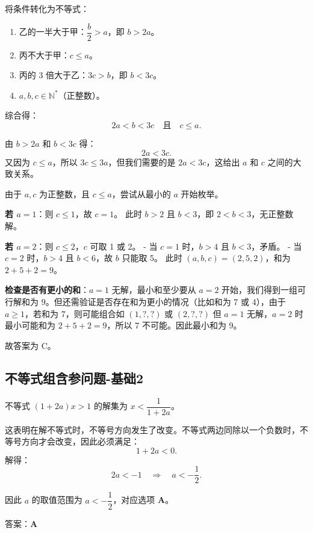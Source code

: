 将条件转化为不等式：

\begin{enumerate}
    \item 乙的一半大于甲：\(\dfrac{b}{2} > a\)，即 \(b > 2a\)。
    \item 丙不大于甲：\(c \le a\)。
    \item 丙的 3 倍大于乙：\(3c > b\)，即 \(b < 3c\)。
    \item \(a, b, c \in \mathbb{N}^*\)（正整数）。
\end{enumerate}

综合得：
\[
2a < b < 3c \quad \text{且} \quad c \le a.
\]

由 \(b > 2a\) 和 \(b < 3c\) 得：
\[
2a < 3c.
\]
又因为 \(c \le a\)，所以 \(3c \le 3a\)，但我们需要的是 \(2a < 3c\)，这给出 \(a\) 和 \(c\) 之间的大致关系。

由于 \(a, c\) 为正整数，且 \(c \le a\)，尝试从最小的 \(a\) 开始枚举。

\textbf{若 \(a=1\)}：则 \(c \le 1\)，故 \(c=1\)。  
此时 \(b > 2\) 且 \(b < 3\)，即 \(2 < b < 3\)，无正整数解。

\textbf{若 \(a=2\)}：则 \(c \le 2\)，\(c\) 可取 1 或 2。  
- 当 \(c=1\) 时，\(b > 4\) 且 \(b < 3\)，矛盾。  
- 当 \(c=2\) 时，\(b > 4\) 且 \(b < 6\)，故 \(b\) 只能取 5。  
此时 \((a,b,c)=(2,5,2)\)，和为 \(2+5+2=9\)。

\textbf{检查是否有更小的和}：\(a=1\) 无解，最小和至少要从 \(a=2\) 开始，我们得到一组可行解和为 9。但还需验证是否存在和为更小的情况（比如和为 7 或 4），由于 \(a\ge1\)，若和为 7，则可能组合如 \((1,?,?)\) 或 \((2,?,?)\) 但 \(a=1\) 无解，\(a=2\) 时最小可能和为 \(2+5+2=9\)，所以 7 不可能。因此最小和为 9。

故答案为 C。


\subsection{不等式组含参问题-基础2}

\label{不等式组含参问题-基础2}  %

不等式 \((1+2a)x > 1\) 的解集为 \(x < \dfrac{1}{1+2a}\)。

这表明在解不等式时，不等号方向发生了改变。不等式两边同除以一个负数时，不等号方向才会改变，因此必须满足：
\[
1+2a < 0.
\]
解得：
\[
2a < -1 \quad\Longrightarrow\quad a < -\dfrac{1}{2}.
\]

因此 \(a\) 的取值范围为 \(a < -\dfrac{1}{2}\)，对应选项 \textbf{A}。

\vspace{2mm}
\noindent 答案：\textbf{A}







